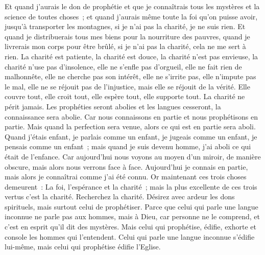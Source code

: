 \begin{multicols}{2}
Et quand j'aurais le don de prophétie et que je connaîtrais tous les mystères et la science de toutes choses~; et quand j'aurais même toute la foi qu'on puisse avoir, jusqu'à transporter les montagnes, si je n'ai pas la charité, je ne suis rien.
Et quand je distribuerais tous mes biens pour la nourriture des pauvres, quand je livrerais mon corps pour être brûlé, si je n'ai pas la charité, cela ne me sert à rien.
La charité est patiente, la charité est douce, la charité n'est pas envieuse, la charité n'use pas d'insolence, elle ne s'enfle pas d'orgueil,
elle ne fait rien de malhonnête, elle ne cherche pas son intérêt, elle ne s'irrite pas, elle n'impute pas le mal,
elle ne se réjouit pas de l'injustice, mais elle se réjouit de la vérité.
Elle couvre tout, elle croit tout, elle espère tout, elle supporte tout.
La charité ne périt jamais. Les prophéties seront abolies et les langues cesseront, la connaissance sera abolie.
Car nous connaissons en partie et nous prophétisons en partie.
Mais quand la perfection sera venue, alors ce qui est en partie sera aboli.
Quand j'étais enfant, je parlais comme un enfant, je jugeais comme un enfant, je pensais comme un enfant~; mais quand je suis devenu homme, j'ai aboli ce qui était de l'enfance.
Car aujourd'hui nous voyons au moyen d'un miroir, de manière obscure, mais alors nous verrons face à face. Aujourd'hui je connais en partie, mais alors je connaîtrai comme j'ai été connu.
Or maintenant ces trois choses demeurent~: La foi, l'espérance et la charité~; mais la plus excellente de ces trois vertus c'est la charité.
\VerseOne{}Recherchez la charité. Désirez avec ardeur les dons spirituels, mais surtout celui de prophétiser.
Parce que celui qui parle une langue inconnue ne parle pas aux hommes, mais à Dieu, car personne ne le comprend, et c'est en esprit qu'il dit des mystères.
Mais celui qui prophétise, édifie, exhorte et console les hommes qui l'entendent.
Celui qui parle une langue inconnue s'édifie lui-même, mais celui qui prophétise édifie l'Eglise.

\end{multicols}
